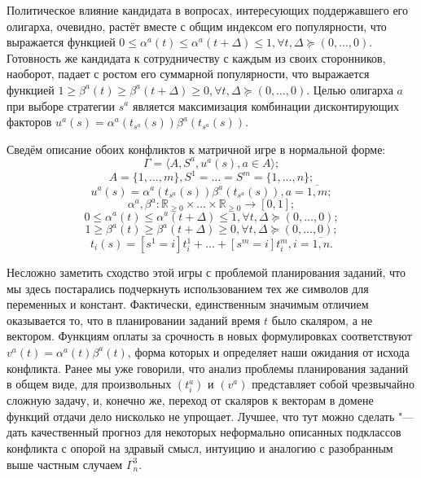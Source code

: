 Политическое влияние кандидата в вопросах, интересующих поддержавшего его олигарха, очевидно, растёт вместе с общим индексом его популярности, что выражается функцией $0 \le \alpha^a(t) \le \alpha^a(t + \Delta) \le 1, \forall t, \Delta \succeq (0, \ldots, 0)$. Готовность же кандидата к сотрудничеству с каждым из своих сторонников, наоборот, падает с ростом его суммарной популярности, что выражается функцией $1 \ge \beta^a(t) \ge \beta^a(t + \Delta) \ge 0, \forall t, \Delta \succeq (0, \ldots, 0)$. Целью олигарха $a$ при выборе стратегии $s^a$ является максимизация комбинации дисконтирующих факторов $u^a(s) = \alpha^a(t_{s^a}(s)) \beta^a(t_{s^a}(s))$.

Сведём описание обоих конфликтов к матричной игре в нормальной форме:
\begin{equation*}
	\Gamma = \langle A, S^a, u^a(s), a \in A \rangle;
\end{equation*}
\begin{equation*}
	A = \{1, \ldots, m\}, S^1 = \ldots = S^m = \{1, \ldots, n\};
\end{equation*}
\begin{equation*}
	u^a(s) = \alpha^a(t_{s^a}(s)) \beta^a(t_{s^a}(s)), a = \overline{1,m};
\end{equation*}
\begin{equation*}
	\alpha^a, \beta^a : \mathbb{R}_{\ge 0} \times \ldots \times \mathbb{R}_{\ge 0} \rightarrow [0, 1];
\end{equation*}
\begin{equation*}
	0 \le \alpha^a(t) \le \alpha^a(t + \Delta) \le 1, \forall t, \Delta \succeq (0, \ldots, 0);
\end{equation*}
\begin{equation*}
	1 \ge \beta^a(t) \ge \beta^a(t + \Delta) \ge 0, \forall t, \Delta \succeq (0, \ldots, 0);
\end{equation*}
\begin{equation*}
	t_i(s) = [s^1 = i] t_i^1 + \ldots + [s^m = i] t_i^m, i = \overline{1,n}.
\end{equation*}

Несложно заметить сходство этой игры с проблемой планирования заданий, что мы здесь постарались подчеркнуть использованием тех же символов для переменных и констант. Фактически, единственным значимым отличием оказывается то, что в планировании заданий время $t$ было скаляром, а не вектором. Функциям оплаты за срочность в новых формулировках соответствуют $v^a(t) = \alpha^a(t) \beta^a(t)$, форма которых и определяет наши ожидания от исхода конфликта. Ранее мы уже говорили, что анализ проблемы планирования заданий в общем виде, для произвольных $(t_i^a)$ и $(v^a)$ представляет собой чрезвычайно сложную задачу, и, конечно же, переход от скаляров к векторам в домене функций отдачи дело нисколько не упрощает. Лучшее, что тут можно сделать "--- дать качественный прогноз для некоторых неформально описанных подклассов конфликта с опорой на здравый смысл, интуицию и аналогию с разобранным выше частным случаем $\Gamma^3_n$.

